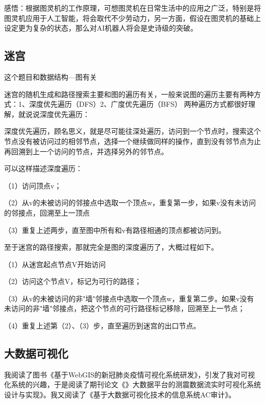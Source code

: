 \documentclass{article}
\begin{document}
感悟：根据图灵机的工作原理，可想图灵机在日常生活中的应用之广泛，特别是将图灵机应用于人工智能，将会取代不少劳动力，另一方面，假设在图灵机的基础上设定更为复杂的状态，那么对AI机器人将会是史诗级的突破。
\subsection{迷宫}
这个题目和数据结构—图有关\par
迷宫的随机生成和路径搜索主要和图的遍历有关，一般来说图的遍历主要有两种方式：1、深度优先遍历（DFS）2、广度优先遍历（BFS）
两种遍历方式都很好理解，就说说深度优先遍历：
\par
深度优先遍历，顾名思义，就是尽可能往深处遍历，访问到一个节点时，搜索这个节点没有被访问过的相邻节点，选择一个继续做同样的操作，直到没有邻节点为止再回溯到上一个访问的节点，并选择另外的邻节点。
\par
可以这样描述深度遍历：

（1）访问顶点v；\par

（2）从v的未被访问的邻接点中选取一个顶点w，重复第一步，如果v没有未访问的邻接点，回溯至上一顶点\par

（3）重复上述两步，直至图中所有和v有路径相通的顶点都被访问到。

至于迷宫的路径搜索，那就完全是图的深度遍历了，大概过程如下。\par

（1）从迷宫起点节点V开始访问\par

（2）访问这个节点V，标记为可行的路径；\par

（3）从v的未被访问的非"墙"邻接点中选取一个顶点w，重复第二步。如果v没有未访问的非"墙"邻接点，把这个节点的可行路径标记移除，回溯至上一节点；\par

（4）重复上述第（2）、（3）步，直至遍历到迷宫的出口节点。\par

\subsection{大数据可视化}

我阅读了图书《基于WebGIS的新冠肺炎疫情可视化系统研发》\citep{基于WebGIS的新冠肺炎疫情可视化系统研发2020}，引发了我对可视化系统的兴趣，于是阅读了期刊论文《》大数据平台的测震数据流实时可视化系统设计与实现》\citep{大数据平台的测震数据流实时可视化系统设计与实现}。我又阅读了《基于大数据可视化技术的信息系统AC审计》\citep{基于大数据可视化技术的信息系统AC审计}。\par
\end{document}
